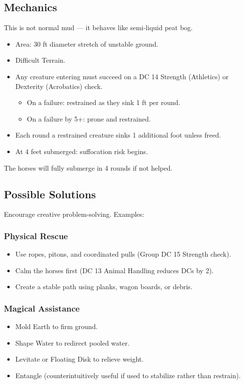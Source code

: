 \subsection*{Mechanics}
{\entryfont This is not normal mud — it behaves like semi-liquid peat bog.
\begin{itemize}
	\item Area: 30 ft diameter stretch of unstable ground.
	\item Difficult Terrain.
	\item Any creature entering must succeed on a DC 14 Strength (Athletics) or Dexterity (Acrobatics) check.
	\begin{itemize}
		\item On a failure: restrained as they sink 1 ft per round.
		\item On a failure by 5+: prone and restrained.
	\end{itemize}
	\item Each round a restrained creature sinks 1 additional foot unless freed.
	\item At 4 feet submerged: suffocation risk begins.
\end{itemize}
The horses will fully submerge in 4 rounds if not helped.}
\vfill\eject
\subsection*{Possible Solutions}
{\entryfont Encourage creative problem-solving. Examples:}
\subsubsection*{Physical Rescue}
{\entryfont\begin{itemize}
	\item Use ropes, pitons, and coordinated pulls (Group DC 15 Strength check).
	\item Calm the horses first (DC 13 Animal Handling reduces DCs by 2).
	\item Create a stable path using planks, wagon boards, or debris.
\end{itemize}}
\subsubsection*{Magical Assistance}
{\entryfont\begin{itemize}
	\item Mold Earth to firm ground.
	\item Shape Water to redirect pooled water.
	\item Levitate or Floating Disk to relieve weight.
	\item Entangle (counterintuitively useful if used to stabilize rather than restrain).
\end{itemize}}
